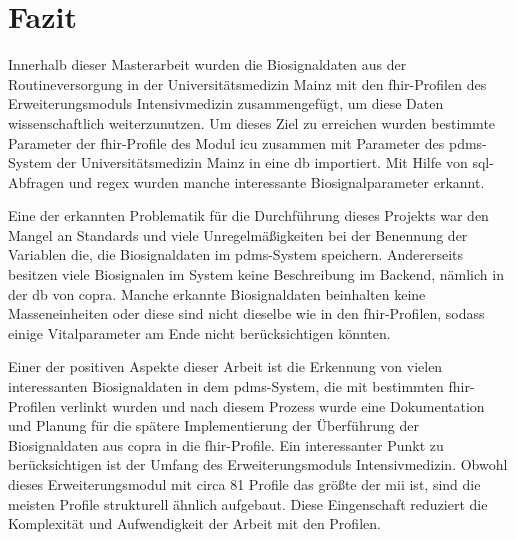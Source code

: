 \chapter{Fazit} \label{ch:conclussion}

Innerhalb dieser Masterarbeit wurden die Biosignaldaten aus der Routineversorgung in der Universitätsmedizin Mainz mit den \ac{fhir}-Profilen des Erweiterungsmoduls Intensivmedizin zusammengefügt, um diese Daten wissenschaftlich weiterzunutzen. Um dieses Ziel zu erreichen wurden bestimmte Parameter der \ac{fhir}-Profile des Modul \ac{icu} zusammen mit Parameter des \ac{pdms}-System der Universitätsmedizin Mainz in eine \ac{db} importiert. Mit Hilfe von \ac{sql}-Abfragen und \ac{regex} wurden manche interessante Biosignalparameter erkannt. 

Eine der erkannten Problematik für die Durchführung dieses Projekts war den Mangel an Standards und viele Unregelmäßigkeiten bei der Benennung der Variablen die, die Biosignaldaten im \ac{pdms}-System speichern. Andererseits besitzen viele Biosignalen im System keine Beschreibung im Backend, nämlich in der \ac{db} von \ac{copra}. Manche erkannte Biosignaldaten beinhalten keine Masseneinheiten oder diese sind nicht dieselbe wie in den \ac{fhir}-Profilen, sodass einige Vitalparameter am Ende nicht berücksichtigen könnten.

Einer der positiven Aspekte dieser Arbeit ist die Erkennung von vielen interessanten Biosignaldaten in dem \ac{pdms}-System, die mit bestimmten \ac{fhir}-Profilen verlinkt wurden und nach diesem Prozess wurde eine Dokumentation und Planung für die spätere Implementierung der Überführung der Biosignaldaten aus \ac{copra} in die \ac{fhir}-Profile. Ein interessanter Punkt zu berücksichtigen ist der Umfang des Erweiterungsmoduls Intensivmedizin. Obwohl dieses Erweiterungsmodul mit circa 81 Profile das größte der \ac{mii} ist, sind die meisten Profile strukturell ähnlich aufgebaut. Diese Eingenschaft reduziert die Komplexität und Aufwendigkeit der Arbeit mit den Profilen. 



